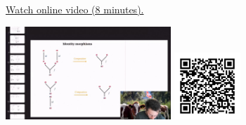 
\begin{minipage}{10cm}
    \href{https://act4e-spring21.netlify.app/videos/spring2021-operads-a:composition-operad.html}{Watch online video (8 minutes).}
        
    \href{https://act4e-spring21.netlify.app/videos/spring2021-operads-a:composition-operad.html}{\includegraphics[height=3.5cm]{spring2021-operads-a:composition-operad/thumbnails.jpg}}
    \href{https://act4e-spring21.netlify.app/videos/spring2021-operads-a:composition-operad.html}{\includegraphics[height=2.5cm]{spring2021-operads-a:composition-operad/qrcode.png}}
\end{minipage}
